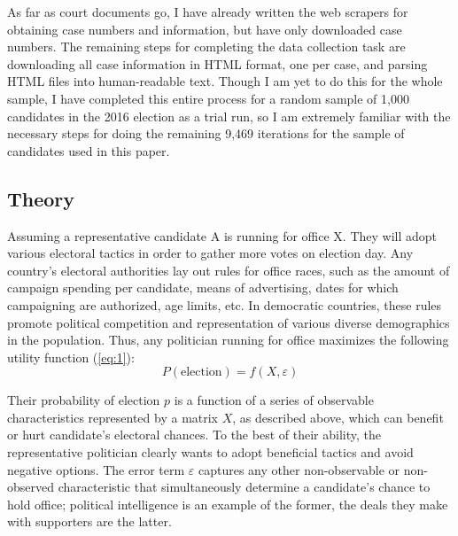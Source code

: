 \documentclass[11pt]{article}
\newcommand{\refp}[1]{(\ref{#1})}
\begin{document}
As far as court documents go, I have already written the web scrapers for obtaining case numbers and information, but have only downloaded case numbers. The remaining steps for completing the data collection task are downloading all case information in HTML format, one per case, and parsing HTML files into human-readable text. Though I am yet to do this for the whole sample, I have completed this entire process for a random sample of 1,000 candidates in the 2016 election as a trial run, so I am extremely familiar with the necessary steps for doing the remaining 9,469 iterations for the sample of candidates used in this paper.

\subsection{Theory} \label{subsec:theory_paper1}

Assuming a representative candidate A is running for office X. They will adopt various electoral tactics in order to gather more votes on election day. Any country's electoral authorities lay out rules for office races, such as the amount of campaign spending per candidate, means of advertising, dates for which campaigning are authorized, age limits, etc. In democratic countries, these rules promote political competition and representation of various diverse demographics in the population. Thus, any politician running for office maximizes the following utility function \refp{eq:1}:
\begin{equation} \label{eq:1}
  P(\text{election}) = f(X, \varepsilon)
\end{equation}

Their probability of election $p$ is a function of a series of observable characteristics represented by a matrix $X$, as described above, which can benefit or hurt candidate's electoral chances. To the best of their ability, the representative politician clearly wants to adopt beneficial tactics and avoid negative options. The error term $\varepsilon$ captures any other non-observable or non-observed characteristic that simultaneously determine a candidate's chance to hold office; political intelligence is an example of the former, the deals they make with supporters are the latter.
\end{document}
